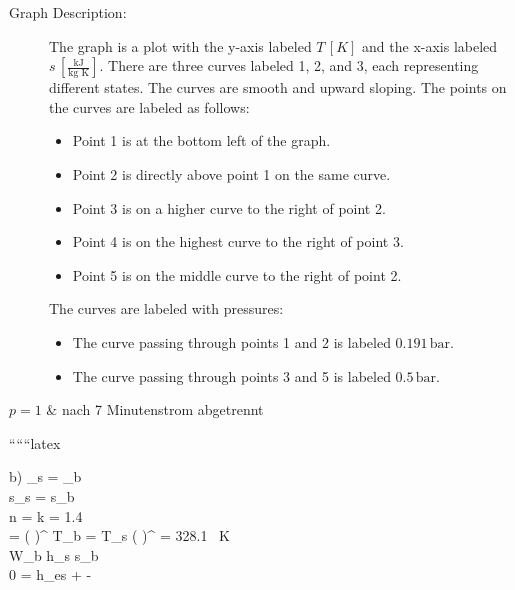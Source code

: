 \begin{description}
    \item[Graph Description:] The graph is a plot with the y-axis labeled $T \, [K]$ and the x-axis labeled $s \, \left[\frac{\text{kJ}}{\text{kg K}}\right]$. There are three curves labeled 1, 2, and 3, each representing different states. The curves are smooth and upward sloping. The points on the curves are labeled as follows:
    \begin{itemize}
        \item Point 1 is at the bottom left of the graph.
        \item Point 2 is directly above point 1 on the same curve.
        \item Point 3 is on a higher curve to the right of point 2.
        \item Point 4 is on the highest curve to the right of point 3.
        \item Point 5 is on the middle curve to the right of point 2.
    \end{itemize}
    The curves are labeled with pressures:
    \begin{itemize}
        \item The curve passing through points 1 and 2 is labeled $0.191 \, \text{bar}$.
        \item The curve passing through points 3 and 5 is labeled $0.5 \, \text{bar}$.
    \end{itemize}
\end{description}

$p = 1$ \& nach 7 Minutenstrom abgetrennt

``````latex


b) \quad {}_s = _b \quad {} \\
\Rightarrow s_s = s_b \Rightarrow {} \\
\Rightarrow n = k = 1.4 \\

 = \left(  \right)^{} \quad T_b = T_s \left(  \right)^{} = 328.1 \, K \\

 \quad W_b \quad {} \quad h_s \quad {} \quad s_b \\

0 =  h_{es}  +  \quad {} - \\

